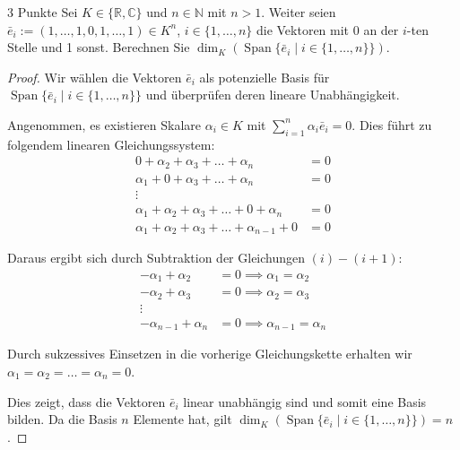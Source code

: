\documentclass{problemset}
\begin{document}
\begin{problem}{3 Punkte}
Sei $K \in \{ \mathbb{R}, \mathbb{C} \}$ und $n \in \mathbb{N}$ mit $n > 1$. Weiter seien $\bar{e}_i := (1, \ldots, 1, 0, 1, \ldots, 1) \in K^n$, $i \in \{1, \ldots, n\}$ die Vektoren mit 0 an der $i$-ten Stelle und 1 sonst. Berechnen Sie $\dim_K(\operatorname{Span}\{\bar{e}_i \mid i \in \{1, \ldots, n\}\})$.

\begin{proof}
    Wir wählen die Vektoren $\bar{e}_i$ als potenzielle Basis für $\operatorname{Span}\{\bar{e}_i \mid i \in \{1, \ldots, n\}\}$ und überprüfen deren lineare Unabhängigkeit.

    Angenommen, es existieren Skalare $\alpha_i \in K$ mit $\sum_{i=1}^{n}
    \alpha_i \bar{e}_i = 0$. Dies führt zu folgendem linearen Gleichungssystem:
    \begin{align}
        0 + \alpha_2 + \alpha_3 + \ldots + \alpha_n                & = 0             \\
        \alpha_1 + 0 + \alpha_3 + \ldots + \alpha_n                & = 0             \\
        \vdots                                                          \tag*{}      \\
        \alpha_1 + \alpha_2 + \alpha_3 + \ldots + 0 + \alpha_n     & = 0 \tag{n - 1} \\
        \alpha_1 + \alpha_2 + \alpha_3 + \ldots + \alpha_{n-1} + 0 & = 0 \tag{n}
    \end{align}

    Daraus ergibt sich durch Subtraktion der Gleichungen $(i)-(i+1)$:
    \begin{align*}
        -\alpha_1 + \alpha_2     & = 0 \implies \alpha_1 = \alpha_2     \\
        -\alpha_2 + \alpha_3     & = 0 \implies \alpha_2 = \alpha_3     \\
        \vdots                                                          \\
        -\alpha_{n-1} + \alpha_n & = 0 \implies \alpha_{n-1} = \alpha_n
    \end{align*}

    Durch sukzessives Einsetzen in die vorherige Gleichungskette erhalten wir
    $\alpha_1 = \alpha_2 = \ldots = \alpha_n = 0$.

    Dies zeigt, dass die Vektoren $\bar{e}_i$ linear unabhängig sind und somit
    eine Basis bilden. Da die Basis $n$ Elemente hat, gilt
    $\dim_K(\operatorname{Span}\{\bar{e}_i \mid i \in \{1, \ldots, n\}\}) = n$.
\end{proof}
\end{problem}
\end{document}
